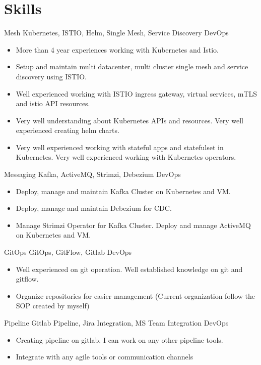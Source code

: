 \documentclass[]{friggeri-cv}
\begin{document}
\section{Skills}
\begin{entrylist}
  \entry
  {Mesh}
  {Kubernetes, ISTIO, Helm, Single Mesh, Service Discovery}
  {DevOps}
  {  \begin{itemize}
      \item More than 4 year experiences working with Kubernetes and Istio.
      \item Setup and maintain multi datacenter, multi cluster single mesh and service discovery using ISTIO.
      \item Well experienced working with ISTIO ingress gateway, virtual services, mTLS and istio API resources.
      \item Very well understanding about Kubernetes APIs and resources. Very well experienced creating helm charts.
      \item Very well experienced working with stateful apps and statefulset in Kubernetes. Very well experienced working with Kubernetes operators.
    \end{itemize}}
  \entry
  {Messaging}
  {Kafka, ActiveMQ, Strimzi, Debezium}
  {DevOps}
  { \begin{itemize}
      \item Deploy, manage and maintain Kafka Cluster on Kubernetes and VM. 
      \item Deploy, manage and maintain Debezium for CDC.
      \item Manage Strimzi Operator for Kafka Cluster. Deploy and manage ActiveMQ on Kubernetes and VM.
    \end{itemize}}
  \entry
  {GitOps}
  {GitOps, GitFlow, Gitlab}
  {DevOps}
  { \begin{itemize}
      \item Well experienced on git operation. Well established knowledge on git and gitflow.
      \item Organize repositories for easier management (Current organization follow the SOP created by myself)
    \end{itemize}}
  \entry
  {Pipeline}
  {Gitlab Pipeline, Jira Integration, MS Team Integration}
  {DevOps}
  { \begin{itemize}
      \item Creating pipeline on gitlab. I can work on any other pipeline tools.
      \item Integrate with any agile tools or communication channels

\end{itemize}}
\end{entrylist}
\end{document}
